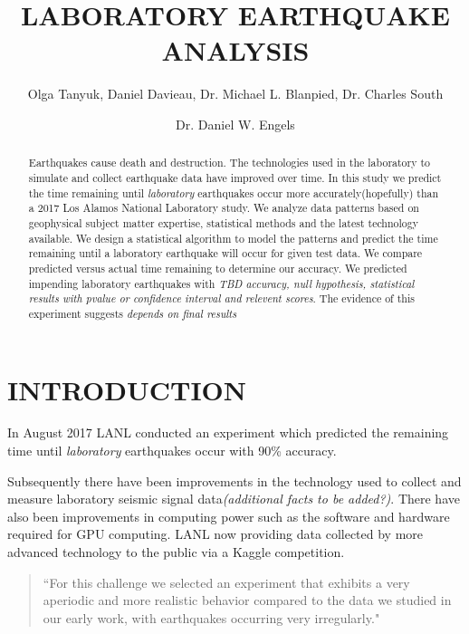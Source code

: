 \documentclass[]{llncs}
\begin{document}

\title{LABORATORY EARTHQUAKE ANALYSIS}

\author{Olga Tanyuk, Daniel Davieau, Dr. Michael L. Blanpied, Dr. Charles South \and Dr. Daniel W. Engels}


\maketitle

\begin{abstract}
Earthquakes cause death and destruction.  The technologies used in the laboratory to simulate and collect earthquake data have improved over time. In this study we predict the time remaining until {\em laboratory} earthquakes occur more accurately(hopefully) than a 2017 Los Alamos National Laboratory study\cite{Bertrand}.  We analyze data patterns based on geophysical subject matter expertise, statistical methods and the latest technology available. We design a statistical algorithm to model the patterns and predict the time remaining until a laboratory earthquake will occur for given test data. We compare predicted versus actual time remaining to determine our accuracy.
We predicted impending laboratory earthquakes with {\em TBD accuracy, null hypothesis, statistical results with pvalue or confidence interval and relevent scores}.
The evidence of this experiment suggests {\em depends on final results}

\end{abstract}
\section{INTRODUCTION}
In August 2017 LANL conducted an experiment\cite{Bertrand} which predicted the remaining time until \emph{laboratory} earthquakes occur with 90\% accuracy. 

Subsequently there have been improvements in the technology used to collect and measure laboratory seismic signal data{\em (additional facts to be added?)}. There have also been improvements in computing power such as the software and hardware required for GPU computing. LANL now providing data collected by more advanced technology to the public via a Kaggle competition.
\begin{quote}
	“For this challenge we selected an experiment that exhibits a very aperiodic and more realistic behavior compared to the data we studied in our early work, with earthquakes occurring very irregularly.\cite{kaggle}" 
\end{quote}
\end{document}
